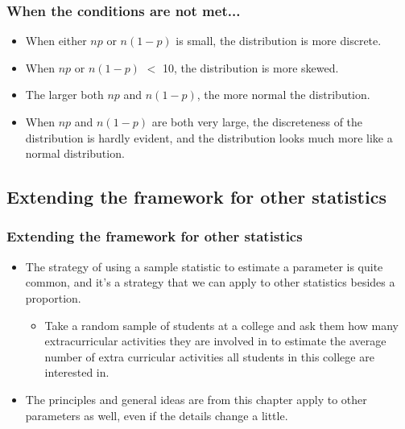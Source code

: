 \documentclass[notes,11pt, aspectratio=169]{beamer}
\begin{document}
\begin{frame}
\frametitle{When the conditions are not met...}

\begin{itemize}

\item When either $np$ or $n(1-p)$ is small, the distribution is more discrete.
\item When $np$ or $n(1-p)$ $<$ 10, the distribution is more skewed.
\item The larger both $np$ and $n(1-p)$, the more normal the distribution.
\item When $np$ and $n(1-p)$ are both very large, the discreteness of the distribution is hardly evident, and the distribution looks much more like a normal distribution.

\end{itemize}

\end{frame}


\subsection{Extending the framework for other statistics}


\begin{frame}
\frametitle{Extending the framework for other statistics}

\begin{itemize}

\item The strategy of using a sample statistic to estimate a parameter is quite common, and it's a strategy that we can apply to other statistics besides a proportion.

\begin{itemize}
\item Take a random sample of students at a college and ask them how many extracurricular activities they are involved in to estimate the average number of extra curricular activities all students in this college are interested in.
\end{itemize}

\item The principles and general ideas are from this chapter apply to other parameters as well, even if the details change a little. 

\end{itemize}

\end{frame}
\end{document}
